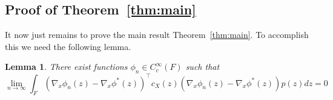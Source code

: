 \documentclass{article}
\theoremstyle{plain}
\newtheorem{lem}{Lemma}
\theoremstyle{definition}
\numberwithin{lem}{section}
\begin{document}
\subsection{Proof of Theorem~\ref{thm:main}} \label{sec:proof_main}
It now just remains to prove the main result Theorem~\ref{thm:main}. To accomplish this we need the following lemma.
\begin{lem}  \label{lem:approx}
    There exist functions $ \phi_n \in C_c^\infty(F)$ such that 
    \[\lim_{n \to \infty} \int_F (\nabla_x \phi_n(z)-\nabla_x \phi^*(z))^\top c_X(z)(\nabla_x \phi_n(z) - \nabla_x \phi^*(z))p(z)dz = 0\]
\end{lem}
\end{document}
